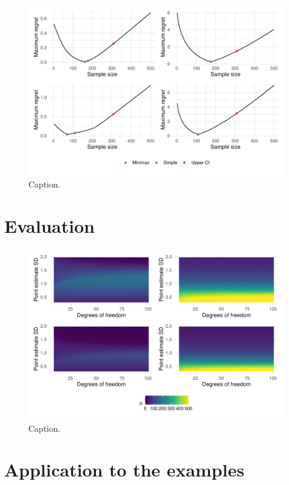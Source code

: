 \documentclass[sagev, Crown]{sagej}
\begin{document}
\begin{figure}
\centering
\includegraphics[scale=0.7]{./figures/p4}
\caption{Caption.}
\label{fig:p4}
\end{figure}

\section{Evaluation}\label{sec:evaluation}

\begin{figure}
\centering
\includegraphics[scale=0.7]{./figures/p3}
\caption{Caption.}
\label{fig:p3}
\end{figure}

\section{Application to the examples}\label{sec:illustration}
\end{document}
